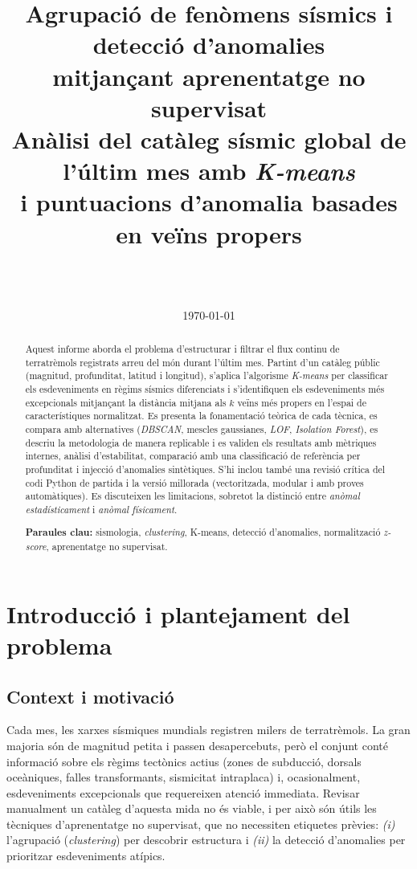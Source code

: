 \documentclass[11pt,a4paper]{article}
\title{\textbf{Agrupació de fenòmens sísmics i detecció d'anomalies\\
mitjançant aprenentatge no supervisat}\\[4pt]
\large Anàlisi del catàleg sísmic global de l'últim mes amb \textit{K-means}\\
i puntuacions d'anomalia basades en veïns propers}
\author{\pend{Nom i cognoms de l'autor/a}\\
\pend{Assignatura i curs}\\
\pend{Tòpic de l'exposició: aprenentatge no supervisat / mineria de dades}}
\date{\today}
\begin{document}
\maketitle

\begin{abstract}
\noindent
Aquest informe aborda el problema d'estructurar i filtrar el flux continu de
terratrèmols registrats arreu del món durant l'últim mes. Partint d'un catàleg
públic (magnitud, profunditat, latitud i longitud), s'aplica l'algorisme
\textit{K-means} per classificar els esdeveniments en règims sísmics
diferenciats i s'identifiquen els esdeveniments més excepcionals mitjançant la
distància mitjana als $k$ veïns més propers en l'espai de característiques
normalitzat. Es presenta la fonamentació teòrica de cada tècnica, es compara
amb alternatives (\textit{DBSCAN}, mescles gaussianes, \textit{LOF},
\textit{Isolation Forest}), es descriu la metodologia de manera replicable i es
validen els resultats amb mètriques internes, anàlisi d'estabilitat,
comparació amb una classificació de referència per profunditat i injecció
d'anomalies sintètiques. S'hi inclou també una revisió crítica del codi
Python de partida i la versió millorada (vectoritzada, modular i amb proves
automàtiques). Es discuteixen les limitacions, sobretot la distinció entre
\emph{anòmal estadísticament} i \emph{anòmal físicament}.

\medskip
\noindent\textbf{Paraules clau:} sismologia, \textit{clustering}, K-means,
detecció d'anomalies, normalització \textit{z-score}, aprenentatge no supervisat.
\end{abstract}

\tableofcontents
\newpage

\section{Introducció i plantejament del problema}\label{sec:intro}

\subsection{Context i motivació}
Cada mes, les xarxes sísmiques mundials registren milers de terratrèmols.
La gran majoria són de magnitud petita i passen desapercebuts, però el
conjunt conté informació sobre els règims tectònics actius (zones de subducció,
dorsals oceàniques, falles transformants, sismicitat intraplaca) i, ocasionalment,
esdeveniments excepcionals que requereixen atenció immediata. Revisar manualment
un catàleg d'aquesta mida no és viable, i per això són útils les tècniques
d'aprenentatge no supervisat, que no necessiten etiquetes prèvies:
\emph{(i)} l'agrupació (\textit{clustering}) per descobrir estructura i
\emph{(ii)} la detecció d'anomalies per prioritzar esdeveniments atípics.
\end{document}
